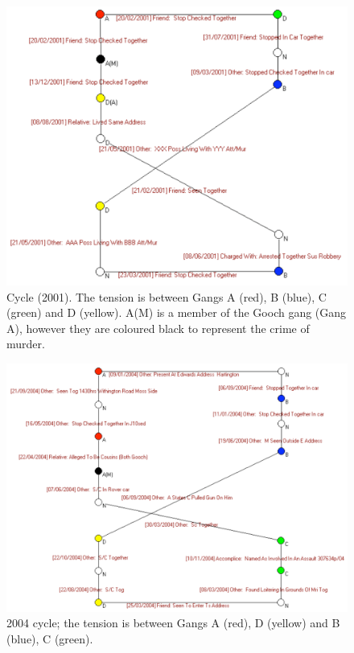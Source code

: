 \documentclass[twocolumn]{svjour3}          %
\theoremstyle{definition}
\begin{document}
\begin{figure}[!ht] 
\centering
\includegraphics[width=\columnwidth]{images/chain2001}
\caption{Cycle (2001). The tension is between Gangs A (red), B (blue),
 C (green) and D (yellow). A(M) is a member of the Gooch gang (Gang A), however they are coloured black to represent the crime of murder.}
\label{fig:chain2001}
\end{figure}


\begin{figure}[!ht] 
\centering
\includegraphics[width=\columnwidth]{images/chain2004}
\caption{2004 cycle; the tension is between Gangs A (red), D (yellow) and B (blue), C (green).}
\label{fig:chain2004}
\end{figure}
\end{document}
